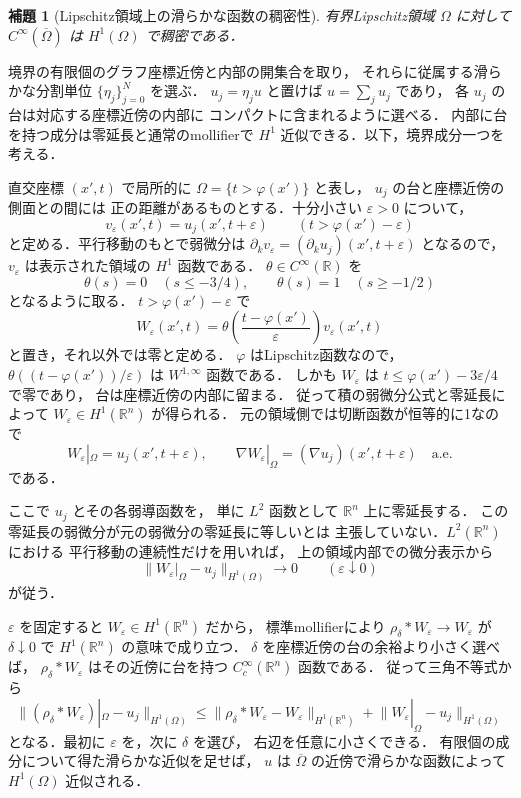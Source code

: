 \documentclass[a5paper,10pt,onecolumn]{jsarticle}
\makeatletter
\theoremstyle{mathnotetheorem}
\newtheorem{lemma}[theorem]{補題}
\renewcommand{\proofname}{証明}
\renewenvironment{proof}[1][\proofname]{%
  \par\pushQED{\qed}\normalfont\topsep4\p@\@plus2\p@\relax
  \trivlist\item[\hskip\labelsep\bfseries #1]\ignorespaces
}{\popQED\endtrivlist\@endpefalse}
\newcommand{\norm}[1]{\lVert #1\rVert}
\makeatother
\begin{document}
\begin{lemma}[Lipschitz領域上の滑らかな函数の稠密性]
\label{lem:lip-density}
有界Lipschitz領域 $\Omega$ に対して
$C^\infty(\overline\Omega)$ は $H^1(\Omega)$ で稠密である．
\end{lemma}
\begin{proof}
境界の有限個のグラフ座標近傍と内部の開集合を取り，
それらに従属する滑らかな分割単位
$\{\eta_j\}_{j=0}^N$ を選ぶ．
$u_j=\eta_j u$ と置けば $u=\sum_j u_j$ であり，
各 $u_j$ の台は対応する座標近傍の内部に
コンパクトに含まれるように選べる．
内部に台を持つ成分は零延長と通常のmollifierで
$H^1$ 近似できる．以下，境界成分一つを考える．

直交座標 $(x',t)$ で局所的に
$\Omega=\{t>\varphi(x')\}$ と表し，
$u_j$ の台と座標近傍の側面との間には
正の距離があるものとする．十分小さい
$\varepsilon>0$ について，
\[
 v_\varepsilon(x',t)=u_j(x',t+\varepsilon)
 \qquad(t>\varphi(x')-\varepsilon)
\]
と定める．平行移動のもとで弱微分は
$\partial_kv_\varepsilon
 =(\partial_ku_j)(x',t+\varepsilon)$
となるので，$v_\varepsilon$ は表示された領域の
$H^1$ 函数である．
$\theta\in C^\infty(\mathbb R)$ を
\[
 \theta(s)=0\quad(s\le-3/4),\qquad
 \theta(s)=1\quad(s\ge-1/2)
\]
となるように取る．
$t>\varphi(x')-\varepsilon$ で
\[
 W_\varepsilon(x',t)
 =\theta\!\left(\frac{t-\varphi(x')}{\varepsilon}\right)
  v_\varepsilon(x',t)
\]
と置き，それ以外では零と定める．
$\varphi$ はLipschitz函数なので，
$\theta((t-\varphi(x'))/\varepsilon)$ は
$W^{1,\infty}$ 函数である．
しかも $W_\varepsilon$ は
$t\le\varphi(x')-3\varepsilon/4$ で零であり，
台は座標近傍の内部に留まる．
従って積の弱微分公式と零延長によって
$W_\varepsilon\in H^1(\mathbb R^n)$ が得られる．
元の領域側では切断函数が恒等的に1なので
\[
 W_\varepsilon|_\Omega
 =u_j(x',t+\varepsilon),\qquad
 \nabla W_\varepsilon|_\Omega
 =(\nabla u_j)(x',t+\varepsilon)
 \quad\text{a.e.}
\]
である．

ここで $u_j$ とその各弱導函数を，
単に $L^2$ 函数として $\mathbb R^n$ 上に零延長する．
この零延長の弱微分が元の弱微分の零延長に等しいとは
主張していない．$L^2(\mathbb R^n)$ における
平行移動の連続性だけを用いれば，
上の領域内部での微分表示から
\[
 \norm{W_\varepsilon|_\Omega-u_j}_{H^1(\Omega)}
 \longrightarrow0\qquad(\varepsilon\downarrow0)
\]
が従う．

$\varepsilon$ を固定すると
$W_\varepsilon\in H^1(\mathbb R^n)$ だから，
標準mollifierにより
$\rho_\delta*W_\varepsilon\to W_\varepsilon$
が $\delta\downarrow0$ で $H^1(\mathbb R^n)$ の意味で成り立つ．
$\delta$ を座標近傍の台の余裕より小さく選べば，
$\rho_\delta*W_\varepsilon$ はその近傍に台を持つ
$C_c^\infty(\mathbb R^n)$ 函数である．
従って三角不等式から
\[
 \norm{(\rho_\delta*W_\varepsilon)|_\Omega-u_j}_{H^1(\Omega)}
 \le
 \norm{\rho_\delta*W_\varepsilon-W_\varepsilon}_{H^1(\mathbb R^n)}
 +\norm{W_\varepsilon|_\Omega-u_j}_{H^1(\Omega)}
\]
となる．最初に $\varepsilon$ を，次に $\delta$ を選び，
右辺を任意に小さくできる．
有限個の成分について得た滑らかな近似を足せば，
$u$ は $\overline\Omega$ の近傍で滑らかな函数によって
$H^1(\Omega)$ 近似される．
\end{proof}
\end{document}
